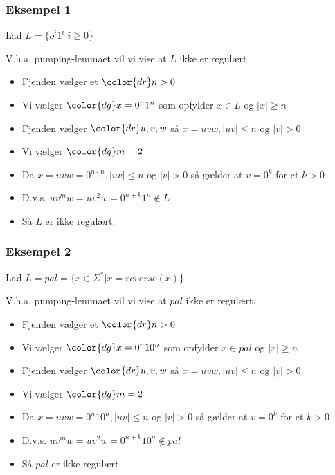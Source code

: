 \begin{frame}
\frametitle{Eksempel 1}
Lad $L = \{o^i1^i | i \geq 0 \}$

V.h.a. pumping-lemmaet vil vi vise at $L$ ikke er regulært.
\begin{itemize}[<+->]
\item Fjenden vælger et ${\color{dr}n}> 0$
\item Vi vælger  ${\color{dg}x=0^n1^n}$ som opfylder $x\in L$ og $|x|\geq n$
\item Fjenden vælger ${\color{dr}u,v,w}$ så $x=uvw, |uv|\leq n \text{ og } |v| > 0$
\item Vi vælger ${\color{dg}m=2}$
\item Da $x = uvw=0^n1^n, |uv|\leq n$ og $|v|>0$ så gælder at $v=0^k$ for et $k>0$
\item D.v.s. $uv^mw = uv^2w=0^{n+k}1^n \not\in L$
\item Så $L$ er \alert{ikke} regulært.
\end{itemize}
\end{frame}

\begin{frame}
\frametitle{Eksempel 2}
Lad $L = pal = \{x\in\Sigma^* | x=reverse(x) \}$

V.h.a. pumping-lemmaet vil vi vise at $pal$ ikke er regulært.

\begin{itemize}[<+->]
\item Fjenden vælger et ${\color{dr}n}> 0$
\item Vi vælger  ${\color{dg}x=0^n10^n}$ som opfylder $x\in pal$ og $|x|\geq n$
\item Fjenden vælger ${\color{dr}u,v,w}$ så $x=uvw, |uv|\leq n \text{ og } |v| > 0$
\item Vi vælger ${\color{dg}m=2}$
\item Da $x = uvw=0^n10^n, |uv|\leq n$ og $|v|>0$ så gælder at $v=0^k$ for et $k>0$
\item D.v.s. $uv^mw = uv^2w=0^{n+k}10^n \not\in pal$
\item Så $pal$ er \alert{ikke} regulært.
\end{itemize}
\end{frame}


